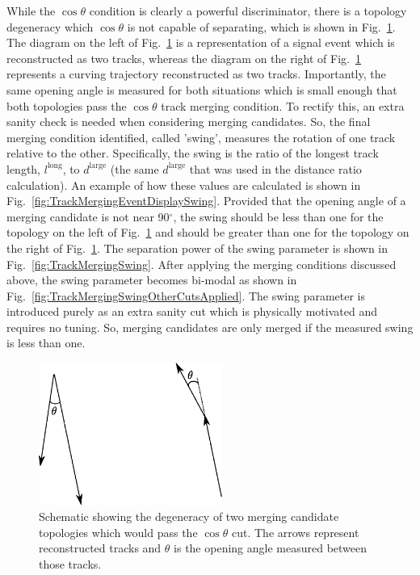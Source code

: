 \newline
\newline
While the $\cos\theta$ condition is clearly a powerful discriminator, there is a topology degeneracy which $\cos\theta$ is not capable of separating, which is shown in Fig.~\ref{fig:TrackMergingCosThetaDegeneracySchematic}.  The diagram on the left of Fig.~\ref{fig:TrackMergingCosThetaDegeneracySchematic} is a representation of a signal event which is reconstructed as two tracks, whereas the diagram on the right of Fig.~\ref{fig:TrackMergingCosThetaDegeneracySchematic} represents a curving trajectory reconstructed as two tracks.  Importantly, the same opening angle is measured for both situations which is small enough that both topologies pass the $\cos\theta$ track merging condition.  To rectify this, an extra sanity check is needed when considering merging candidates.  So, the final merging condition identified, called 'swing', measures the rotation of one track relative to the other.  Specifically, the swing is the ratio of the longest track length, $l^{\textrm{long}}$, to $d^{\textrm{large}}$ (the same $d^{\textrm{large}}$ that was used in the distance ratio calculation).  An example of how these values are calculated is shown in Fig.~\ref{fig:TrackMergingEventDisplaySwing}.  Provided that the opening angle of a merging candidate is not near 90$^\circ$, the swing should be less than one for the topology on the left of Fig.~\ref{fig:TrackMergingCosThetaDegeneracySchematic} and should be greater than one for the topology on the right of Fig.~\ref{fig:TrackMergingCosThetaDegeneracySchematic}.  The separation power of the swing parameter is shown in Fig.~\ref{fig:TrackMergingSwing}.  After applying the merging conditions discussed above, the swing parameter becomes bi-modal as shown in Fig.~\ref{fig:TrackMergingSwingOtherCutsApplied}.  The swing parameter is introduced purely as an extra sanity cut which is physically motivated and requires no tuning.  So, merging candidates are only merged if the measured swing is less than one.
\begin{figure}
  \centering
  \includegraphics[width=6cm]{images/selection/vertex_recon/TrackMergingCosThetaDegeneracySchematic.eps}
  \caption{Schematic showing the degeneracy of two merging candidate topologies which would pass the $\cos\theta$ cut.  The arrows represent reconstructed tracks and $\theta$ is the opening angle measured between those tracks.}
  \label{fig:TrackMergingCosThetaDegeneracySchematic}
\end{figure}
